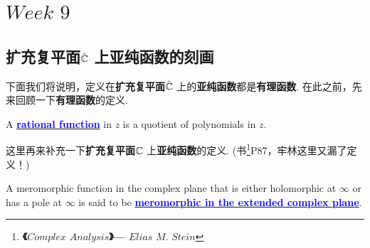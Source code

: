 \ifx\allfiles\undefined


	\else
	\fi

\chapter{$Week \,\, 9$}
\section{扩充复平面$\hat{\mathbb{C}}$ 上亚纯函数的刻画}
	下面我们将说明，定义在\textbf{扩充复平面$\hat{\mathbb{C}}$} 上的\textbf{亚纯函数}都是\textbf{有理函数}. 在此之前，先来回顾一下\textbf{有理函数}的定义.
	\begin{defn}\label{def 9.1.1}
		A \underline{\textcolor{blue}{\textbf{rational function}}} in $z$ is a quotient of polynomials in $z$.
	\end{defn}

	\vspace{2em}
	这里再来补充一下\textbf{扩充复平面$\mathbb{C}$} 上\textbf{亚纯函数}的定义. (书\footnote{\textbf{《$Complex \,\, Analysis$》---  $Elias \,\, M. \,\, Stein$}}P87，牢林这里又漏了定义！)
	\begin{defn}\label{def 9.1.2}
		A meromorphic function in the complex plane that is either holomorphic at $\infty$ or has a pole at $\infty$ is said to be \underline{\textcolor{blue}{\textbf{meromorphic in the extended complex plane}}}.
	\end{defn}

